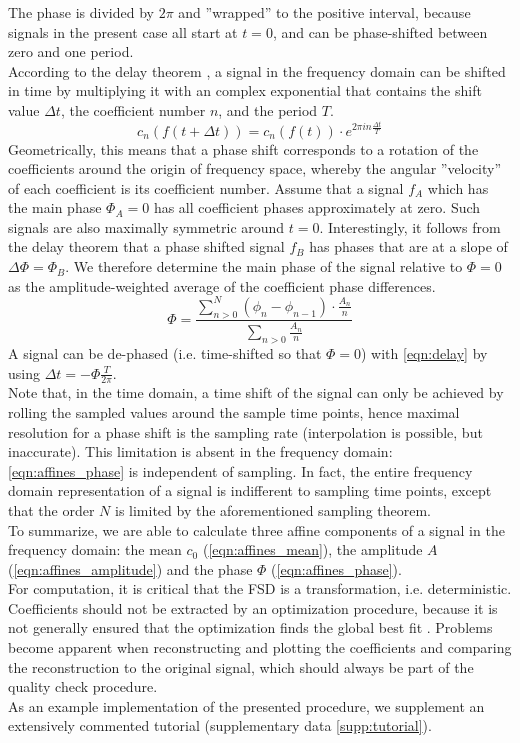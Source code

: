 The phase is divided by $2\pi$ and ''wrapped'' to the positive interval, because signals in the present case all start at $t=0$, and can be phase-shifted between zero and one period.
\\According to the delay theorem \cite[also shift theorem,][p. 111]{Bracewell2000}, a signal in the frequency domain can be shifted in time by multiplying it with an complex exponential that contains the shift value $\Delta t$, the coefficient number $n$, and the period $T$.
\begin{equation}\label{eqn:delay}
  c_{n}\left( f(t+\Delta t)\right) = c_{n}\left( f(t)\right)\cdot e^{2\pi i n \frac{\Delta t}{T}}
\end{equation}
Geometrically, this means that a phase shift corresponds to a rotation of the coefficients around the origin of frequency space, whereby the angular ''velocity'' of each coefficient is its coefficient number.
Assume that a signal $f_{A}$ which has the main phase $\Phi_{A} = 0$ has all coefficient phases approximately at zero.
Such signals are also maximally symmetric around $t=0$.
Interestingly, it follows from the delay theorem that a phase shifted signal $f_{B}$ has phases that are at a slope of $\Delta \Phi = \Phi_{B}$.
We therefore determine the main phase of the signal relative to $\Phi=0$ as the amplitude-weighted average of the coefficient phase differences.
	\begin{equation}\label{eqn:affines_phase}
	\Phi = \frac{\sum_{n>0}^{N} (\phi_{n}-\phi_{n-1})\cdot \frac{A_{n}}{n}}{\sum_{n>0} \frac{A_{n}}{n}}
	\end{equation}
A signal can be de-phased (i.e. time-shifted so that $\Phi=0$) with \eqref{eqn:delay} by using $\Delta t = -\Phi \frac{T}{2\pi}$.
\\Note that, in the time domain, a time shift of the signal can only be achieved by rolling the sampled values around the sample time points, hence maximal resolution for a phase shift is the sampling rate (interpolation is possible, but inaccurate).
This limitation is absent in the frequency domain: \eqref{eqn:affines_phase} is independent of sampling.
In fact, the entire frequency domain representation of a signal is indifferent to sampling time points, except that the order $N$ is limited by the aforementioned sampling theorem.
\\To summarize, we are able to calculate three affine components of a signal in the frequency domain: the mean $c_{0}$ (\eqref{eqn:affines_mean}), the amplitude $A$ (\eqref{eqn:affines_amplitude}) and the phase $\Phi$ (\eqref{eqn:affines_phase}).
\bigskip\\For computation, it is critical that the FSD is a transformation, i.e. deterministic.
Coefficients should not be extracted by an optimization procedure, because it is not generally ensured that the optimization finds the global best fit \cite{Hubel2015,Basu2019}.
Problems become apparent when reconstructing and plotting the coefficients and comparing the reconstruction to the original signal, which should always be part of the quality check procedure.
\\ As an example implementation of the presented procedure, we supplement an extensively commented tutorial (supplementary data \ref*{supp:tutorial}).



